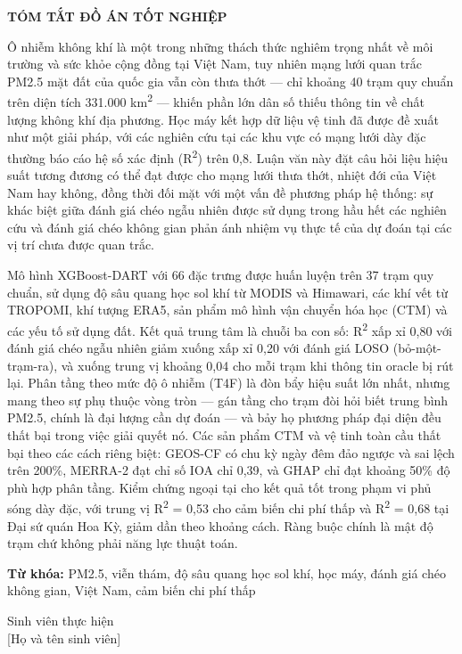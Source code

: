 \documentclass[../DoAn.tex]{subfiles}
\begin{document}
\begin{center}
    \Large{\textbf{TÓM TẮT ĐỒ ÁN TỐT NGHIỆP}}\\
\end{center}
\vspace{0.5cm}

Ô nhiễm không khí là một trong những thách thức nghiêm trọng nhất về môi trường và sức khỏe cộng đồng tại Việt Nam, tuy nhiên mạng lưới quan trắc PM2.5 mặt đất của quốc gia vẫn còn thưa thớt --- chỉ khoảng 40 trạm quy chuẩn trên diện tích 331.000 km\textsuperscript{2} --- khiến phần lớn dân số thiếu thông tin về chất lượng không khí địa phương. Học máy kết hợp dữ liệu vệ tinh đã được đề xuất như một giải pháp, với các nghiên cứu tại các khu vực có mạng lưới dày đặc thường báo cáo hệ số xác định (R\textsuperscript{2}) trên 0,8. Luận văn này đặt câu hỏi liệu hiệu suất tương đương có thể đạt được cho mạng lưới thưa thớt, nhiệt đới của Việt Nam hay không, đồng thời đối mặt với một vấn đề phương pháp hệ thống: sự khác biệt giữa đánh giá chéo ngẫu nhiên được sử dụng trong hầu hết các nghiên cứu và đánh giá chéo không gian phản ánh nhiệm vụ thực tế của dự đoán tại các vị trí chưa được quan trắc.

Mô hình XGBoost-DART với 66 đặc trưng được huấn luyện trên 37 trạm quy chuẩn, sử dụng độ sâu quang học sol khí từ MODIS và Himawari, các khí vết từ TROPOMI, khí tượng ERA5, sản phẩm mô hình vận chuyển hóa học (CTM) và các yếu tố sử dụng đất. Kết quả trung tâm là chuỗi ba con số: R\textsuperscript{2} xấp xỉ 0,80 với đánh giá chéo ngẫu nhiên giảm xuống xấp xỉ 0,20 với đánh giá LOSO (bỏ-một-trạm-ra), và xuống trung vị khoảng 0,04 cho mỗi trạm khi thông tin oracle bị rút lại. Phân tầng theo mức độ ô nhiễm (T4F) là đòn bẩy hiệu suất lớn nhất, nhưng mang theo sự phụ thuộc vòng tròn --- gán tầng cho trạm đòi hỏi biết trung bình PM2.5, chính là đại lượng cần dự đoán --- và bảy họ phương pháp đại diện đều thất bại trong việc giải quyết nó. Các sản phẩm CTM và vệ tinh toàn cầu thất bại theo các cách riêng biệt: GEOS-CF có chu kỳ ngày đêm đảo ngược và sai lệch trên 200\%, MERRA-2 đạt chỉ số IOA chỉ 0,39, và GHAP chỉ đạt khoảng 50\% độ phù hợp phân tầng. Kiểm chứng ngoại tại cho kết quả tốt trong phạm vi phủ sóng dày đặc, với trung vị R\textsuperscript{2} = 0,53 cho cảm biến chi phí thấp và R\textsuperscript{2} = 0,68 tại Đại sứ quán Hoa Kỳ, giảm dần theo khoảng cách. Ràng buộc chính là mật độ trạm chứ không phải năng lực thuật toán.

\vspace{0.5cm}
\textbf{Từ khóa:} PM2.5, viễn thám, độ sâu quang học sol khí, học máy, đánh giá chéo không gian, Việt Nam, cảm biến chi phí thấp

\vspace{1cm}
Sinh viên thực hiện\\
\vspace{1cm}
[Họ và tên sinh viên]
\end{document}
